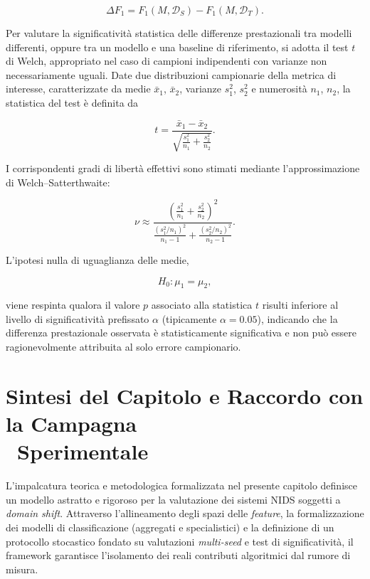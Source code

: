 \begin{equation}
    \Delta F_1=F_1(M,\mathcal{D}_S)-F_1(M,\mathcal{D}_T).
\end{equation}

Per valutare la significatività statistica delle differenze prestazionali tra modelli differenti, oppure tra un modello e una baseline di riferimento, si adotta il test $t$ di Welch, appropriato nel caso di campioni indipendenti con varianze non necessariamente uguali. Date due distribuzioni campionarie della metrica di interesse, caratterizzate da medie $\bar{x}_1$, $\bar{x}_2$, varianze $s_1^2$, $s_2^2$ e numerosità $n_1$, $n_2$, la statistica del test è definita da

\begin{equation}
    t=\frac{\bar{x}_1-\bar{x}_2}{\sqrt{\frac{s_1^2}{n_1}+\frac{s_2^2}{n_2}}}.
\end{equation}

I corrispondenti gradi di libertà effettivi sono stimati mediante l'approssimazione di Welch--Satterthwaite:

\begin{equation}
    \nu\approx\frac{\left(\frac{s_1^2}{n_1}+\frac{s_2^2}{n_2}\right)^2}{\frac{\left(s_1^2/n_1\right)^2}{n_1-1}+\frac{\left(s_2^2/n_2\right)^2}{n_2-1}}.
\end{equation}

L'ipotesi nulla di uguaglianza delle medie,

\[
    H_0:\mu_1=\mu_2,
\]

viene respinta qualora il valore $p$ associato alla statistica $t$ risulti inferiore al livello di significatività prefissato $\alpha$ (tipicamente $\alpha=0.05$), indicando che la differenza prestazionale osservata è statisticamente significativa e non può essere ragionevolmente attribuita al solo errore campionario.

\section[Sintesi del Capitolo e Raccordo con la Campagna Sperimentale]{Sintesi del Capitolo e Raccordo con la Campagna \\\ Sperimentale}
\label{sec:sintesi_raccordo_ch4}

L'impalcatura teorica e metodologica formalizzata nel presente capitolo definisce un modello astratto e rigoroso per la valutazione dei sistemi NIDS soggetti a \textit{domain shift}. 
Attraverso l'allineamento degli spazi delle \textit{feature}, la formalizzazione dei modelli di classificazione (aggregati e specialistici) e la definizione di un protocollo stocastico fondato su valutazioni \textit{multi-seed} e test di significatività, il framework garantisce l'isolamento dei reali contributi algoritmici dal rumore di misura.

